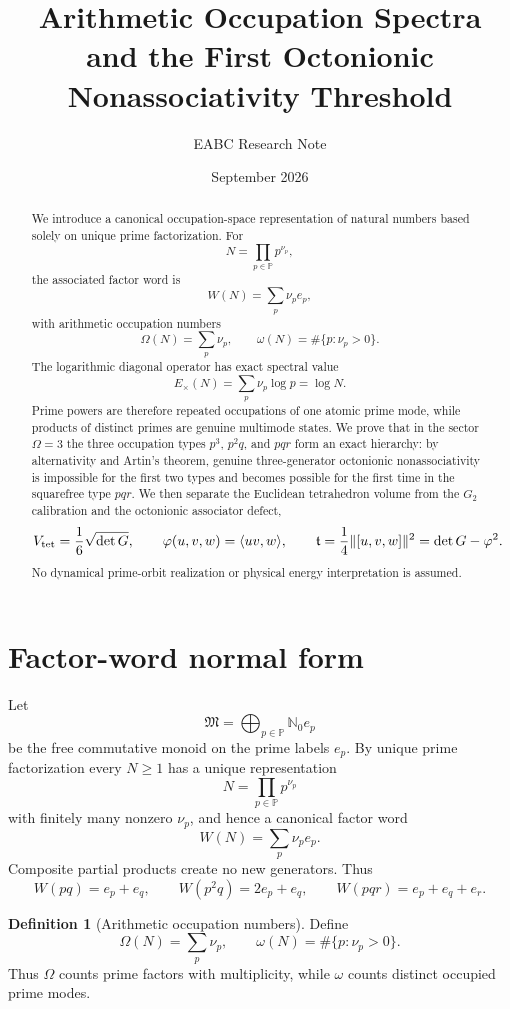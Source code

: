 \documentclass[11pt,a4paper]{article}
\title{\textbf{Arithmetic Occupation Spectra and the First Octonionic Nonassociativity Threshold}}
\author{EABC Research Note}
\date{September 2026}
\theoremstyle{definition}
\newtheorem{definition}[theorem]{Definition}
\theoremstyle{remark}
\newcommand{\PP}{\mathbb P}
\newcommand{\NN}{\mathbb N}
\begin{document}
\maketitle

\begin{abstract}
We introduce a canonical occupation-space representation of natural numbers based solely on unique prime factorization. For
\[
N=\prod_{p\in\PP}p^{\nu_p},
\]
the associated factor word is
\[
W(N)=\sum_p\nu_p e_p,
\]
with arithmetic occupation numbers
\[
\Omega(N)=\sum_p\nu_p,
\qquad
\omega(N)=\#\{p:\nu_p>0\}.
\]
The logarithmic diagonal operator has exact spectral value
\[
E_\times(N)=\sum_p\nu_p\log p=\log N.
\]
Prime powers are therefore repeated occupations of one atomic prime mode, while products of distinct primes are genuine multimode states. We prove that in the sector $\Omega=3$ the three occupation types $p^3$, $p^2q$, and $pqr$ form an exact hierarchy: by alternativity and Artin's theorem, genuine three-generator octonionic nonassociativity is impossible for the first two types and becomes possible for the first time in the squarefree type $pqr$. We then separate the Euclidean tetrahedron volume from the $G_2$ calibration and the octonionic associator defect,
\[
V_{\rm tet}=\frac16\sqrt{\det G},\qquad
\varphi(u,v,w)=\langle uv,w\rangle,\qquad
\mathfrak t=\frac14\|[u,v,w]\|^2=\det G-\varphi^2.
\]
No dynamical prime-orbit realization or physical energy interpretation is assumed.
\end{abstract}

\section{Factor-word normal form}
Let
\[
\mathfrak M=\bigoplus_{p\in\PP}\NN_0 e_p
\]
be the free commutative monoid on the prime labels $e_p$. By unique prime factorization every $N\ge1$ has a unique representation
\[
N=\prod_{p\in\PP}p^{\nu_p}
\]
with finitely many nonzero $\nu_p$, and hence a canonical factor word
\begin{equation}
W(N)=\sum_p\nu_p e_p.
\end{equation}
Composite partial products create no new generators. Thus
\[
W(pq)=e_p+e_q,\qquad
W(p^2q)=2e_p+e_q,\qquad
W(pqr)=e_p+e_q+e_r.
\]

\begin{definition}[Arithmetic occupation numbers]
Define
\[
\Omega(N)=\sum_p\nu_p,
\qquad
\omega(N)=\#\{p:\nu_p>0\}.
\]
Thus $\Omega$ counts prime factors with multiplicity, while $\omega$ counts distinct occupied prime modes.
\end{definition}
\end{document}
